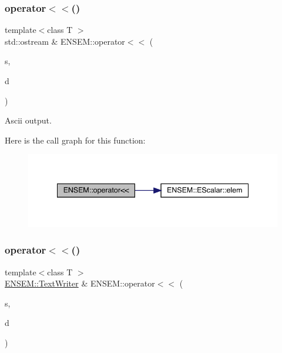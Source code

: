 \subsubsection{\texorpdfstring{operator$<$$<$()}{operator<<()}\hspace{0.1cm}{\footnotesize\ttfamily [1/4]}}
{\footnotesize\ttfamily template$<$class T $>$ \\
std\+::ostream \& E\+N\+S\+E\+M\+::operator$<$$<$ (\begin{DoxyParamCaption}\item[{std\+::ostream \&}]{s,  }\item[{const \mbox{\hyperlink{classENSEM_1_1EScalar}{E\+Scalar}}$<$ T $>$ \&}]{d }\end{DoxyParamCaption})\hspace{0.3cm}{\ttfamily [inline]}}



Ascii output. 

Here is the call graph for this function\+:
\nopagebreak
\begin{figure}[H]
\begin{center}
\leavevmode
\includegraphics[width=341pt]{d4/dca/group__escalar_ga2a24d07560f549aee97bb63ceed9ed50_cgraph}
\end{center}
\end{figure}
\mbox{\label{group__escalar_ga4fa895e4a145c879739c3f8497717e98}} 
\subsubsection{\texorpdfstring{operator$<$$<$()}{operator<<()}\hspace{0.1cm}{\footnotesize\ttfamily [2/4]}}
{\footnotesize\ttfamily template$<$class T $>$ \\
\mbox{\hyperlink{classENSEM_1_1TextWriter}{E\+N\+S\+E\+M\+::\+Text\+Writer}} \& E\+N\+S\+E\+M\+::operator$<$$<$ (\begin{DoxyParamCaption}\item[{\mbox{\hyperlink{classENSEM_1_1TextWriter}{E\+N\+S\+E\+M\+::\+Text\+Writer}} \&}]{s,  }\item[{const \mbox{\hyperlink{classENSEM_1_1EScalar}{E\+Scalar}}$<$ T $>$ \&}]{d }\end{DoxyParamCaption})\hspace{0.3cm}{\ttfamily [inline]}}



